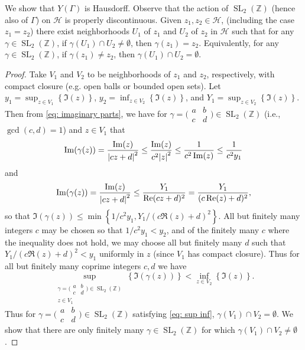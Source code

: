 \documentclass[10pt,leqno]{article}
\newcommand{\cbr}[1]{\left\{#1\right\}}
\DeclareMathOperator{\SL}{SL}
\begin{document}
We show that $Y(\varGamma)$ is Hausdorff. Observe that the action of $\SL_2(\mathbb{Z})$ (hence also of $\varGamma$) on $\mathcal H$ is properly discontinuous. Given $z_1,z_2\in \mathcal H$, (including the case $z_1 = z_2$) there exist neighborhoods $U_1$ of $z_1$ and $U_2$ of $z_2$ in $\mathcal H$ such that for any $\gamma\in \SL_2(\mathbb{Z})$, if $\gamma(U_1)\cap U_2\neq \emptyset$, then $\gamma(z_1) = z_2$. Equivalently, for any $\gamma\in\SL_2(\mathbb{Z})$, if $\gamma(z_1)\neq z_2$, then $\gamma(U_1)\cap U_2= \emptyset$.
\begin{proof}
    Take $V_1$ and $V_2$ to be neighborhoods of $z_1$ and $z_2$, respectively, with compact closure (e.g. open balls or bounded open sets). Let $y_1 = \sup_{z\in V_1}\cbr{\Im(z)}$, $y_2 = \inf_{z\in V_2}\cbr{\Im(z)}$, and $Y_1 = \sup_{z\in V_2}\cbr{\Im(z)}$. Then from \cref{eq: imaginary parts}, we have for $\gamma = \big(\!\begin{smallmatrix}
        a & b \\ c & d
    \end{smallmatrix}\!\big)\in \SL_2(\mathbb{Z})$ (i.e., $\gcd(c,d) = 1$) and $z\in V_1$ that \[\Im(\gamma(z)) = \frac{\Im(z)}{\abs{cz+d}^2}\leq \frac{\Im(z)}{c^2\abs{z}^2}\leq \frac{1}{c^2\Im(z)}\leq \frac{1}{c^2y_1}\] and \[\Im(\gamma(z)) = \frac{\Im(z)}{\abs{cz+d}^2}\leq \frac{Y_1}{\Re(cz+d)^2} = \frac{Y_1}{(c\Re(z)+d)^2},\] so that $\Im(\gamma(z))\leq\min\cbr{1/c^2y_1,Y_1/(c\Re(z)+d)^2}$. All but finitely many integers $c$ may be chosen so that $1/c^2y_1< y_2$, and of the finitely many $c$ where the inequality does not hold, we may choose all but finitely many $d$ such that $Y_1/(c\Re(z)+d)^2< y_1$ uniformly in $z$ (since $V_1$ has compact closure). Thus for all but finitely many coprime integers $c,d$ we have \begin{equation}\label{eq: sup inf}
        \sup_{\substack{\gamma  = \big(\!\begin{smallmatrix}
            a & b \\ c & d
        \end{smallmatrix}\!\big)\in \SL_2(\mathbb{Z})\\z\in V_1}}\cbr{\Im(\gamma(z))}< \inf_{z\in V_2}\cbr{\Im(z)}.
    \end{equation} Thus for $\gamma = \big(\!\begin{smallmatrix}
        a & b \\ c & d
    \end{smallmatrix}\!\big)\in \SL_2(\mathbb{Z})$ satisfying \cref{eq: sup inf}, $\gamma(V_1)\cap V_2=\emptyset$. We show that there are only finitely many $\gamma\in \SL_2(\mathbb{Z})$ for which $\gamma(V_1)\cap V_2\neq\emptyset$.


\end{proof}
\end{document}
